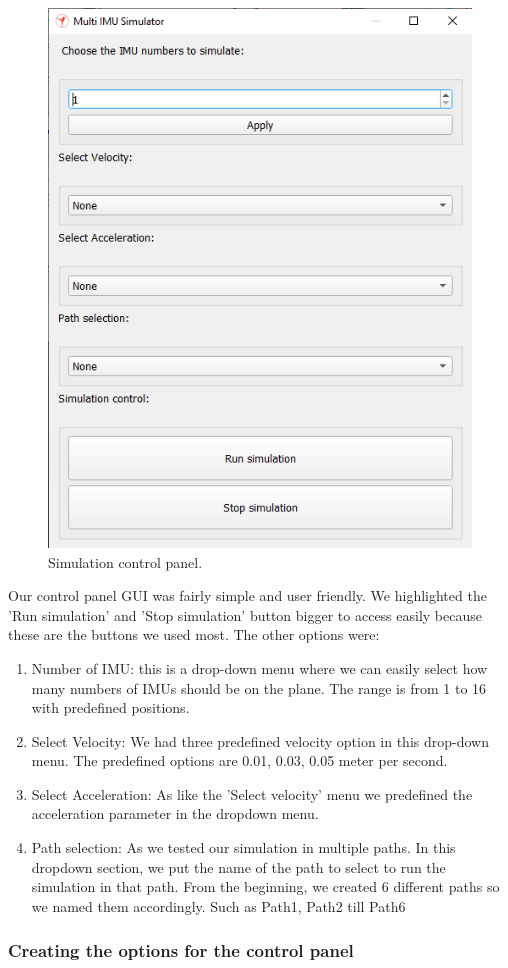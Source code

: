 \begin{figure}[h]
  \centering
    \includegraphics[width=0.6\linewidth]{figures/simCPanel.png}
    \caption{Simulation control panel.}
\label{fig:simCP}
\end{figure}


Our control panel GUI was fairly simple and user friendly. We highlighted the 'Run simulation' and 'Stop simulation' button bigger to access easily because these are the buttons we used most. 
The other options were:
\begin{enumerate}
  \item Number of IMU: this is a drop-down menu where we can easily select how many numbers of IMUs should be on the plane. The range is from 1 to 16 with predefined positions.
  \item Select Velocity: We had three predefined velocity option in this drop-down menu. The predefined options are 0.01, 0.03, 0.05 meter per second.
  \item Select Acceleration: As like the 'Select velocity'  menu we predefined the acceleration parameter in the dropdown menu.
  \item Path selection: As we tested our simulation in multiple paths. In this dropdown section, we put the name of the path to select to run the simulation in that path. From the beginning, we created 6 different paths so we named them accordingly. Such as Path1, Path2 till Path6 
\end{enumerate}


\subsubsection{Creating the options for the control panel}


